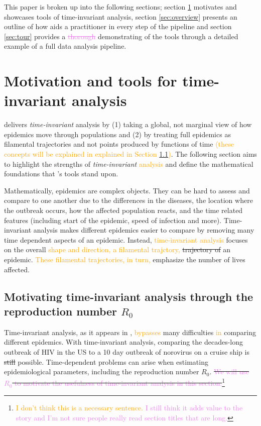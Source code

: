 \documentclass[
  shortnames]{jss}
\begin{document}
This paper is broken up into the following sections; section
\ref{sec:time-invariant} motivates and showcases tools of time-invariant
analysis, section \ref{sec:overview} presents an outline of how
 aids a practitioner in every step of the pipeline and
section \ref{sec:tour} provides a \textcolor{violet}{\sout{thorough}}
demonstrating of the tools through a detailed example of a full data
analysis pipeline.

\section[Time-invariant]{Motivation and tools for time-invariant
analysis}\label{sec:time-invariant}

 delivers \textit{time-invariant} analysis by (1) taking
a global, not marginal view of how epidemics move through populations
and (2) by treating full epidemics as filamental trajectories and not
points produced by functions of time
\textcolor{orange}{(these concepts will be explained in  explained in Section \ref{sec:r0})}.
The following section aims to highlight the strengths of
\textit{time-invariant} \textcolor{orange}{analysis} and define the
mathematical foundations that 's tools stand upon.

Mathematically, epidemics are complex objects. They can be hard to
assess and compare to one another due to the differences in the
diseases, the location where the outbreak occurs, how the affected
population reacts, and the time related features (including start of the
epidemic, speed of infection and more). Time-invariant analysis makes
different epidemics easier to compare by removing many time dependent
aspects of an epidemic. Instead,
\textcolor{orange}{time-invariant analysis} focuses on the overall
\textcolor{orange}{shape and direction, a filamental trajctory,}
\sout{trajectory of }an epidemic.
\textcolor{orange}{These filamental trajectories,  in turn,} emphasize
the number of lives affected.

\subsection[motivating through R0]{Motivating time-invariant analysis
through the reproduction number \(R_0\)}\label{sec:r0}

Time-invariant analysis, as it appears in ,
\textcolor{orange}{bypasses} many difficulties \textcolor{orange}{in}
comparing different epidemics. With time-invariant analysis, comparing
the decades-long outbreak of HIV in the US to a 10 day outbreak of
norovirus on a cruise ship is \sout{still} possible. Time-dependent
problems can arise when estimating epidemiological parameters, including
the reproduction number \(R_0\).
\sout{\textcolor{violet}{We will use $R_0$ to motivate the usefulness of time-invariant analysis in this section.}}\footnote{\textcolor{orange}{I don't think this is a necessary sentence.}
  \textcolor{violet}{I still think it adds value to the story and I'm not sure people really read section titles that are long.}}
\end{document}
